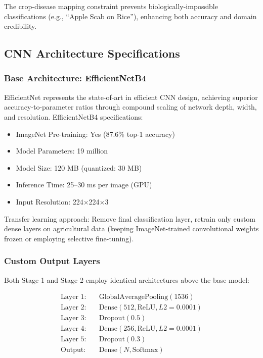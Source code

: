 \documentclass[conference]{IEEEtran}
\begin{document}
The crop-disease mapping constraint prevents biologically-impossible classifications (e.g., ``Apple Scab on Rice''), enhancing both accuracy and domain credibility.

\subsection{CNN Architecture Specifications}

\subsubsection{Base Architecture: EfficientNetB4}

EfficientNet represents the state-of-art in efficient CNN design, achieving superior accuracy-to-parameter ratios through compound scaling of network depth, width, and resolution. EfficientNetB4 specifications:

\begin{itemize}
\item ImageNet Pre-training: Yes (87.6\% top-1 accuracy)
\item Model Parameters: 19 million
\item Model Size: 120 MB (quantized: 30 MB)
\item Inference Time: 25--30 ms per image (GPU)
\item Input Resolution: 224$\times$224$\times$3
\end{itemize}

Transfer learning approach: Remove final classification layer, retrain only custom dense layers on agricultural data (keeping ImageNet-trained convolutional weights frozen or employing selective fine-tuning).

\subsubsection{Custom Output Layers}

Both Stage 1 and Stage 2 employ identical architectures above the base model:

\begin{equation}
\begin{aligned}
\text{Layer 1:} & \quad \text{GlobalAveragePooling}(1536) \\
\text{Layer 2:} & \quad \text{Dense}(512, \text{ReLU}, L2=0.0001) \\
\text{Layer 3:} & \quad \text{Dropout}(0.5) \\
\text{Layer 4:} & \quad \text{Dense}(256, \text{ReLU}, L2=0.0001) \\
\text{Layer 5:} & \quad \text{Dropout}(0.3) \\
\text{Output:} & \quad \text{Dense}(N, \text{Softmax})
\end{aligned}
\end{equation}
\end{document}
